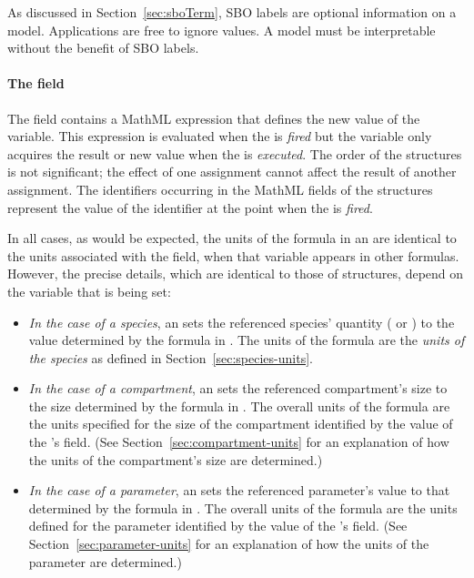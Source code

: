 As discussed in Section~\ref{sec:sboTerm}, SBO labels are optional
information on a model.  Applications are free to ignore
 values.  A model must be interpretable without the
benefit of SBO labels.


\paragraph{The  field}

The  field contains a MathML expression that defines
the new value of the variable. This expression is evaluated when
the \Event is \emph{fired} but the variable only acquires the
result or new value when the \Event is \emph{executed}. The order
of the \EventAssignment structures is not significant; the effect
of one assignment cannot affect the result of another assignment.
The identifiers occurring in the MathML  fields of the
\EventAssignment structures represent the value of the identifier
at the point when the \Event is \emph{fired}.

In all cases, as would be expected, the units of the formula in an
\EventAssignment are identical to the units associated with the
 field, when that variable appears in other
formulas. However, the precise details, which are identical to
those of \AssignmentRule structures, depend on the variable that
is being set:
\begin{itemize}
  
\item \emph{In the case of a species}, an \EventAssignment sets
  the referenced species' quantity ( or
  ) to the value determined by the
  formula in .  The units of the formula are the
  \emph{units of the species} as defined in
  Section~\ref{sec:species-units}.
  
\item \emph{In the case of a compartment}, an \EventAssignment
  sets the referenced compartment's size to the size determined by
  the formula in .  The overall units of the formula
  are the units specified for the size of the compartment
  identified by the value of the \EventAssignment's
   field.  (See
  Section~\ref{sec:compartment-units} for an explanation of how
  the units of the compartment's size are determined.)
  
\item \emph{In the case of a parameter}, an \EventAssignment sets
  the referenced parameter's value to that determined by the
  formula in .  The overall units of the formula are
  the units defined for the parameter identified by the value of
  the \EventAssignment's  field.  (See
  Section~\ref{sec:parameter-units} for an explanation of how the
  units of the parameter are determined.)

\end{itemize}


